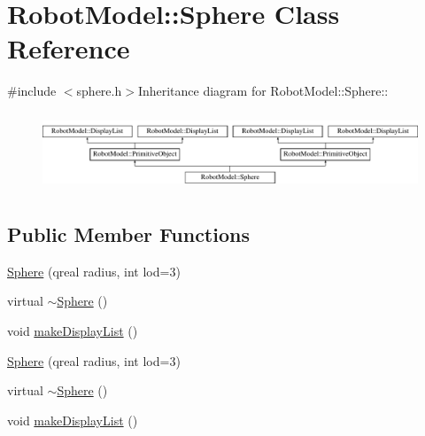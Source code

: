 \hypertarget{class_robot_model_1_1_sphere}{
\section{RobotModel::Sphere Class Reference}
\label{class_robot_model_1_1_sphere}
}


{\ttfamily \#include $<$sphere.h$>$}Inheritance diagram for RobotModel::Sphere::\begin{figure}[H]
\begin{center}
\leavevmode
\includegraphics[height=2.35955cm]{class_robot_model_1_1_sphere}
\end{center}
\end{figure}
\subsection*{Public Member Functions}
\begin{DoxyCompactItemize}
\item 
\hyperlink{class_robot_model_1_1_sphere_a9944239ac9fc56091f17701f547652da}{Sphere} (qreal radius, int lod=3)
\item 
virtual \hyperlink{class_robot_model_1_1_sphere_a569c071e50a3e11f678630ee1a17737e}{$\sim$Sphere} ()
\item 
void \hyperlink{class_robot_model_1_1_sphere_a838b5ae4f743aabe24a255dd61d2843c}{makeDisplayList} ()
\item 
\hyperlink{class_robot_model_1_1_sphere_a0a673e3782cc9d061c0f421b2970b4a6}{Sphere} (qreal radius, int lod=3)
\item 
virtual \hyperlink{class_robot_model_1_1_sphere_a19b5af03f0c3f6b28db4d741cbaf5c17}{$\sim$Sphere} ()
\item 
void \hyperlink{class_robot_model_1_1_sphere_a0f338501410a9d8e220ff20ce073d244}{makeDisplayList} ()
\end{DoxyCompactItemize}


